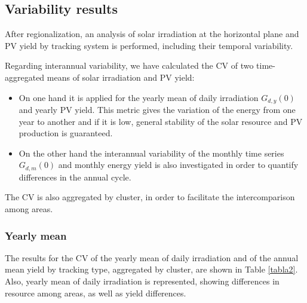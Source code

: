 \subsection{Variability results}

After regionalization, an analysis of solar irradiation at the horizontal plane and PV yield by tracking system is performed, including their temporal variability.

Regarding interannual variability, we have calculated the CV of two time-aggregated means of solar irradiation and PV yield:

\begin{itemize}
\item On one hand it is applied for the yearly mean of daily irradiation $G_{d,y}(0)$ and yearly PV yield. This metric gives the variation of the energy from one year to another and if it is low, general stability of the solar resource and PV production is guaranteed. 
\item On the other hand the interannual variability of the monthly time series $G_{d,m}(0)$ and monthly energy yield is also investigated in order to quantify differences in the annual cycle. 
\end{itemize}

The CV is also aggregated by cluster, in order to facilitate the intercomparison among areas.



\subsubsection{Yearly mean}

The results for the CV of the yearly mean of daily irradiation and of the annual mean yield by tracking type, aggregated by cluster, are shown in Table \ref{tabla2}. Also, yearly mean of daily irradiation is represented, showing differences in resource among areas, as well as yield differences.

